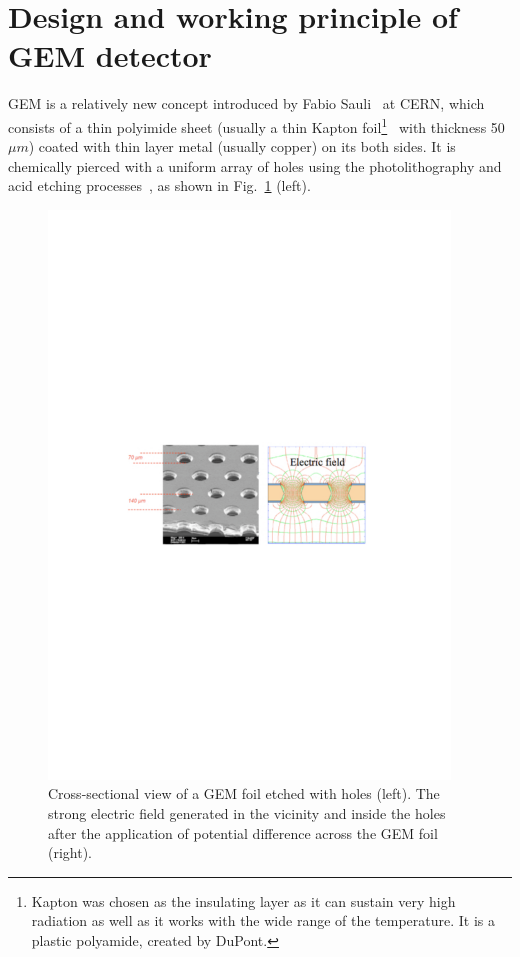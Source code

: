 \section{Design and working principle of GEM detector} %
\label{sec:design_and_working_principle_of_gem}
GEM is a relatively new concept introduced by Fabio Sauli~\cite{Sauli1997} at CERN, which consists of a thin polyimide sheet (usually a thin Kapton foil\footnote{Kapton was chosen as the insulating layer as it can sustain very high radiation as well as it works with the wide range of the temperature. It is a plastic polyamide, created by DuPont.}~\cite{Kapton-sheet} with thickness 50 $\mu m$) coated with thin layer metal (usually copper) on its both sides.
It is chemically pierced with a uniform array of holes using the photolithography and acid etching processes~\cite{Benlloch1998}, as shown in Fig.~\ref{fig:gem} (left).
\begin{figure}[!htbp]
    \centering
    \includegraphics[width=0.95\textwidth]{figures/GEM/KEKDTP3.pdf}
    \caption{Cross-sectional view of a GEM foil etched with holes (left). The strong electric field generated in the vicinity and inside the holes after the application of potential difference across the GEM foil (right).}
    \label{fig:gem}
\end{figure}

